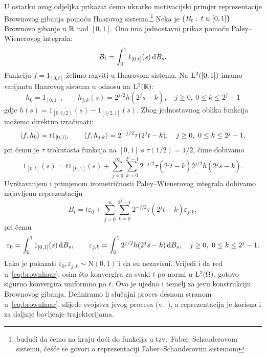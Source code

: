 \documentclass[main.tex]{subfiles}
\begin{document}
U ostatku ovog odjeljka prikazat ćemo ukratko motivacijski primjer reprezentacije Brownovog gibanja
pomoću Haarovog sistema.\footnote{budući da ćemo na kraju doći do funkcija u tzv.\ Faber--Schauderovom sistemu, češće se govori o reprezentaciji Faber--Schauderovim sistemom}
Neka je \( \left\{ B_t \, \colon \, t \in \left[ 0,1 \right] \right\} \) Brownovo gibanje u \( \mathbb{R} \) nad
\( \left[ 0,1 \right] \). Ono ima jednostavni prikaz
pomoću Paley--Wienerovog integrala:
\begin{equation} \label{eq:bmwint}
	B_t = \int_0^1 1_{\left[ 0,t \right]}(s) \,\mathrm d B_s.
\end{equation}
Funkciju \( f = 1_{\left[ 0,t \right]} \) želimo razviti u Haarovom sistemu. Na \( \mathrm{L}^2(\left[0,1  \right]) \)
imamo varijantu Haarovog sistema u odnosu na \( \mathrm{L}^2(\mathbb{R}) \):
\begin{equation}
	h_0 = 1_{\left[0,1 \right]}, \qquad h_{j,k}(s) = 2^{j/2}h(2^js - k), \quad j \ge 0, \ 0 \le k \le 2^j-1
\end{equation}
gdje \( h(s) = 1_{\left[ 0, 1/2 \right\rangle}(s) - 1_{\left[ 1/2,1 \right]}(s) \). Zbog jednostavnog
oblika funkcija možemo direktno izračunati:
\begin{equation}
	\left\langle {f}, {h_0} \right\rangle = t1_{\left[ 0,1 \right]}, \qquad
	\left\langle {f}, {h_{j,k}} \right\rangle = 2^{-j/2} \tau(2^jt - k), \quad j \ge 0, \ 0 \le k \le 2^j-1,
\end{equation}
pri čemu je \( \tau \) trokutasta funkcija na \( \left[ 0,1 \right] \) s \( \tau(1/2)=1/2 \), čime
dobivamo
\begin{equation}
	1_{\left[ 0,t \right]}(s) = t1_{\left[ 0,1 \right]}(s) +
	\sum_{j=0}^\infty \sum_{k=0}^{2^j-1}
	2^{-j/2} \tau(2^jt - k)2^{j/2} h(2^js - k).
\end{equation}
Uvrštavanjem i primjenom izometričnosti Paley--Wienerovog integrala dobivamo na\-jav\-lje\-nu reprezentaciju
\begin{equation} \label{eq:brownhaar}
	B_t = t\varepsilon_0 + \sum_{j=0}^\infty\sum_{k=0}^{2^j-1} 2^{-j/2}\tau(2^jt - k) \varepsilon_{j,k},
\end{equation}
pri čemu
\begin{equation}
	\varepsilon_0 = \int_0^1 1_{\left[ 0,1 \right]}(s) \,\mathrm d B_s, \qquad
	\varepsilon_{j,k} = \int_0^1 2^{j/2} h(2^js - k) \,\mathrm d B_s, \quad j \ge 0, \ 0 \le k \le 2^j-1.
\end{equation}
Lako je pokazati \( \varepsilon_0, \varepsilon_{j,k} \sim \mathrm N(0,1) \) i da su nezavisni.
Vrijedi i da red u~\eqref{eq:brownhaar}, osim što konvergira za svaki \( t \) po
normi u \( \mathrm{L}^2(\Omega) \), gotovo sigurno konvergira uniformno po \( t \).
Ovo je ujedno i temelj za \levy jevu konstrukciju Brownovog gibanja. Definiramo li
slučajni proces desnom stranom u~\eqref{eq:brownhaar}, slijede
svojstva \levy jevog procesa (v.~\cite{diez}), a reprezentacija je korisna
i za daljnje bavljenje trajektorijama.
\end{document}
